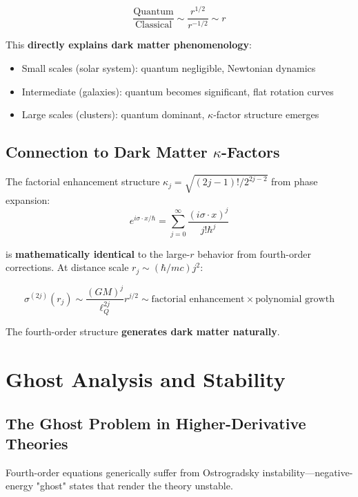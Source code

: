 \documentclass[11pt,a4paper]{article}
\theoremstyle{definition}
\theoremstyle{remark}
\begin{document}
	\begin{equation}
		\frac{\text{Quantum}}{\text{Classical}} \sim \frac{r^{1/2}}{r^{-1/2}} \sim r
	\end{equation}
	
	This \textbf{directly explains dark matter phenomenology}:
	\begin{itemize}
		\item Small scales (solar system): quantum negligible, Newtonian dynamics
		\item Intermediate (galaxies): quantum becomes significant, flat rotation curves
		\item Large scales (clusters): quantum dominant, $\kappa$-factor structure emerges
	\end{itemize}
	
	\subsection{Connection to Dark Matter $\kappa$-Factors}
	
	The factorial enhancement structure $\kappa_j = \sqrt{(2j-1)!/2^{2j-2}}$ from phase expansion:
	\begin{equation}
		e^{i\sigma \cdot x/\hbar} = \sum_{j=0}^\infty \frac{(i\sigma \cdot x)^j}{j!\hbar^j}
	\end{equation}
	
	is \textbf{mathematically identical} to the large-$r$ behavior from fourth-order corrections. At distance scale $r_j \sim (\hbar/mc)j^2$:
	
	\begin{equation}
		\sigma^{(2j)}(r_j) \sim \frac{(GM)^j}{\ell_Q^{2j}}r^{j/2} \sim \text{factorial enhancement} \times \text{polynomial growth}
	\end{equation}
	
	The fourth-order structure \textbf{generates dark matter naturally}.
	
	\section{Ghost Analysis and Stability}
	
	\subsection{The Ghost Problem in Higher-Derivative Theories}
	
	Fourth-order equations generically suffer from Ostrogradsky instability—negative-energy "ghost" states that render the theory unstable.
	
\end{document}
